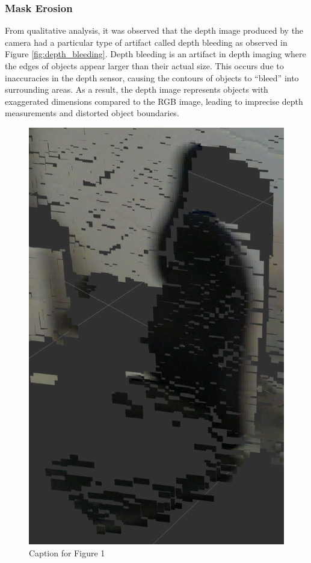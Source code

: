\subsubsection[Mask Erosion]{Mask Erosion}
\noindent
\begin{minipage}{0.55\textwidth}
    From qualitative analysis, it was observed that the depth image produced by the camera had a particular type of artifact called depth bleeding as observed in Figure \ref{fig:depth_bleeding}.
    Depth bleeding is an artifact in depth imaging where the edges of objects appear larger than their actual size. 
    This occurs due to inaccuracies in the depth sensor, causing the contours of objects to “bleed” into surrounding areas.
    As a result, the depth image represents objects with exaggerated dimensions compared to the RGB image, 
    leading to imprecise depth measurements and distorted object boundaries.
\end{minipage}
\begin{minipage}{0.4\textwidth}
    \begin{figure}[H] %
        \centering
        \includegraphics[width=\textwidth]{figs/depth_bleeding.png}
        \caption{Caption for Figure 1}
        \label{fig:figure1}
    \end{figure}
\end{minipage}
